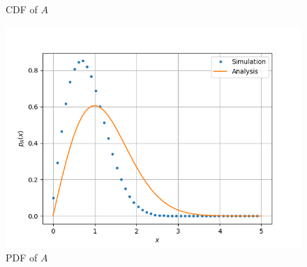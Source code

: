 \documentclass[journal,12pt,twocolumn]{IEEEtran}
\renewcommand\thesection{\arabic{section}}
\begin{document}
\begin{enumerate}[label=\thesection.\arabic*
,ref=\thesection.\theenumi]
\begin{figure}[!htb]
	\caption{CDF of $A$}
	\label{fig:ral-cdf}
\end{figure}
\begin{figure}[!htb]
	\includegraphics[width=\columnwidth]{figs/6_3_pdf.png}
	\caption{PDF of $A$}
	\label{fig:ral-pdf}
\end{figure}
\end{enumerate}
\end{document}
